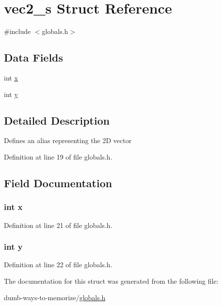 \hypertarget{structvec2__s}{}\section{vec2\+\_\+s Struct Reference}
\label{structvec2__s}


{\ttfamily \#include $<$globals.\+h$>$}

\subsection*{Data Fields}
\begin{DoxyCompactItemize}
\item 
int \hyperlink{structvec2__s_a6150e0515f7202e2fb518f7206ed97dc}{x}
\item 
int \hyperlink{structvec2__s_a0a2f84ed7838f07779ae24c5a9086d33}{y}
\end{DoxyCompactItemize}


\subsection{Detailed Description}
Defines an alias representing the 2D vector 

Definition at line 19 of file globals.\+h.



\subsection{Field Documentation}
\subsubsection[{\texorpdfstring{x}{x}}]{\setlength{\rightskip}{0pt plus 5cm}int x}\hypertarget{structvec2__s_a6150e0515f7202e2fb518f7206ed97dc}{}\label{structvec2__s_a6150e0515f7202e2fb518f7206ed97dc}


Definition at line 21 of file globals.\+h.

\subsubsection[{\texorpdfstring{y}{y}}]{\setlength{\rightskip}{0pt plus 5cm}int y}\hypertarget{structvec2__s_a0a2f84ed7838f07779ae24c5a9086d33}{}\label{structvec2__s_a0a2f84ed7838f07779ae24c5a9086d33}


Definition at line 22 of file globals.\+h.



The documentation for this struct was generated from the following file\+:\begin{DoxyCompactItemize}
\item 
dumb-\/ways-\/to-\/memorize/\hyperlink{globals_8h}{globals.\+h}\end{DoxyCompactItemize}
